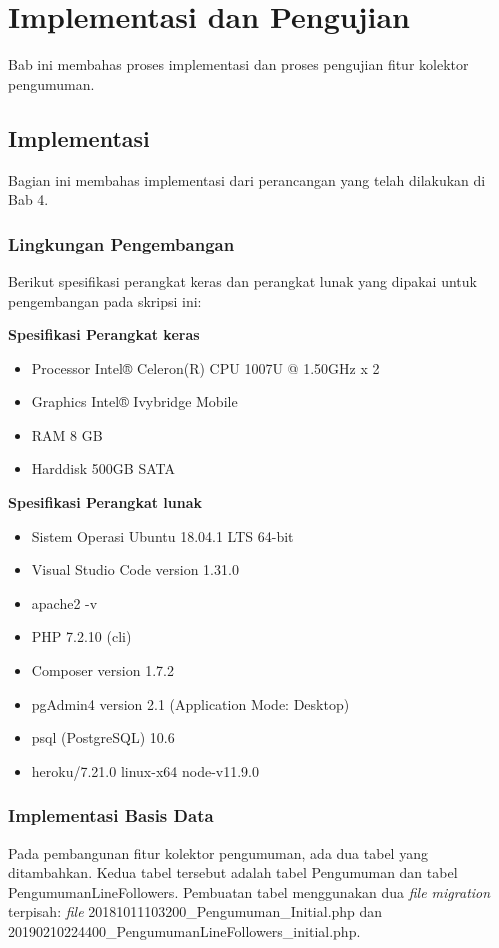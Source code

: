 
\chapter{Implementasi dan Pengujian}
\label{chap:implementasiDanPengujian}

Bab ini membahas proses implementasi dan proses pengujian fitur kolektor pengumuman.
\section{Implementasi}
Bagian ini membahas implementasi dari perancangan yang telah dilakukan di Bab 4.
\subsection{Lingkungan Pengembangan}
Berikut spesifikasi perangkat keras dan perangkat lunak yang dipakai untuk pengembangan pada skripsi ini:

\textbf{Spesifikasi Perangkat keras}
\begin{itemize}
\item Processor Intel® Celeron(R) CPU 1007U @ 1.50GHz x 2 
\item Graphics Intel® Ivybridge Mobile
\item RAM 8 GB
\item Harddisk 500GB SATA
\end{itemize}

\textbf{Spesifikasi Perangkat lunak}
\begin{itemize}
\item Sistem Operasi Ubuntu 18.04.1 LTS 64-bit
\item Visual Studio Code version 1.31.0
\item apache2 -v
\item PHP 7.2.10 (cli)
\item Composer version 1.7.2
\item pgAdmin4 version 2.1 (Application Mode: Desktop)
\item psql (PostgreSQL) 10.6
\item heroku/7.21.0 linux-x64 node-v11.9.0
\end{itemize}

\subsection{Implementasi Basis Data}
Pada pembangunan fitur kolektor pengumuman, ada dua tabel yang ditambahkan. Kedua tabel tersebut adalah tabel Pengumuman dan tabel PengumumanLineFollowers. Pembuatan tabel menggunakan dua \textit{file migration} terpisah: \textit{file} 20181011103200\_Pengumuman\_Initial.php dan 20190210224400\_PengumumanLineFollowers\_initial.php.


